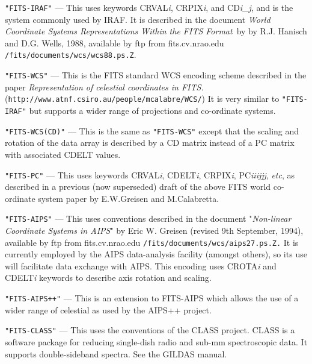 \documentclass[twoside,11pt]{article}
\newcommand{\htmladdnormallink}[2]{#1}
\newcommand{\latex}[1]{#1}
\newcommand{\sstitem}{\item}
\newcommand{\sstitem}{\item}
\begin{document}
{{{         \sstitem 
         \texttt{"FITS-IRAF"} --- This uses keywords CRVAL\textit{i},
         CRPIX\textit{i}, and CD\textit{i\_j}, and is the
         system commonly used by IRAF. It is described in the document
         \textit{World Coordinate Systems Representations Within the FITS
         Format}\ by by R.J. Hanisch and D.G. Wells, 1988, available by ftp from
         fits.cv.nrao.edu \texttt{/fits/documents/wcs/wcs88.ps.Z}.


         \sstitem
         \texttt{"FITS-WCS"} --- This is the FITS standard WCS encoding 
         scheme described in the paper 
         \htmladdnormallink{\textit{Representation of celestial coordinates in FITS.}}
         {http://www.atnf.csiro.au/people/mcalabre/WCS/}\\ \latex{
         (\texttt{http://www.atnf.csiro.au/people/mcalabre/WCS/})}  It is
         very similar to \texttt{"FITS-IRAF"} but supports a wider range of
         projections and co-ordinate systems.

         \sstitem
         \texttt{"FITS-WCS(CD)"} --- This is the same as \texttt{"FITS-WCS"}
         except that the scaling and rotation of the data array is described by a 
         CD matrix instead of a PC matrix with associated CDELT values.

         \sstitem
         \texttt{"FITS-PC"} --- This uses keywords CRVAL\textit{i},
         CDELT\textit{i}, CRPIX\textit{i}, PC\textit{iiijjj}, 
         \textit{etc}, as described in a previous (now superseded) draft of
         the above FITS world co-ordinate system paper by E.W.Greisen and 
         M.Calabretta.

         \sstitem
         \texttt{"FITS-AIPS"} --- This uses conventions described in the
         document "\textit{Non-linear Coordinate Systems in AIPS}" by
         Eric W. Greisen (revised 9th September, 1994), available by ftp
         from fits.cv.nrao.edu \texttt{/fits/documents/wcs/aips27.ps.Z.}
         It is currently employed by the AIPS data-analysis facility
         (amongst others), so its use
         will facilitate data exchange with AIPS. This encoding uses
         CROTA\textit{i} and CDELT\textit{i} keywords to describe axis
         rotation and scaling.

         \sstitem 
         \texttt{"FITS-AIPS++"} --- This is an extension to FITS-AIPS which 
         allows the use of a wider range of celestial as used by the AIPS++ 
         project.

         \sstitem
         \texttt{"FITS-CLASS"} --- This uses the conventions of the CLASS
         project.  CLASS is a software package for reducing single-dish 
         radio and sub-mm spectroscopic data.  It supports double-sideband 
         spectra.  See \htmladdnormallink{the GILDAS 
         manual}{http://www.iram.fr/IRAMFR/GILDAS/doc/html/class-html/class.html}.

}}}
\end{document}
